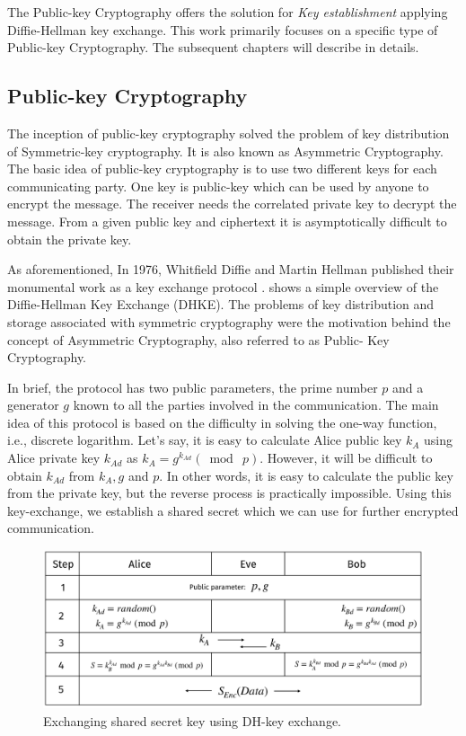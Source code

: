 The Public-key Cryptography offers the solution for \textit{Key establishment} applying Diffie-Hellman key exchange.
This work primarily focuses on a specific type of Public-key Cryptography. 
The subsequent chapters will describe in details.

\subsection{Public-key Cryptography}
\label{ch1_subsec_pkc}
The inception of public-key cryptography solved the problem of key distribution of Symmetric-key cryptography.
It is also known as Asymmetric Cryptography.
The basic idea of public-key cryptography is to use two different keys for each communicating party.
One key is public-key which can be used by anyone to encrypt the message. 
The receiver needs the correlated private key to decrypt the message.
From a given public key and ciphertext it is asymptotically difficult to obtain the private key.

As aforementioned, In 1976, Whitfield Diffie and Martin Hellman published their monumental work as a key exchange protocol \cite{diffie1976new}.  
 shows a simple overview of the Diffie-Hellman Key Exchange (DHKE).
The problems of key distribution and storage associated with symmetric cryptography were the motivation behind the concept of Asymmetric Cryptography, also referred to as Public- Key Cryptography. 

In brief, the protocol has two public parameters, the prime number $p$ and a generator $g$ known to all the parties involved in the communication.
The main idea of this protocol is based on the difficulty in solving the one-way function, i.e., discrete logarithm.
Let's say, it is easy to calculate Alice public key $k_A$ using Alice private key $k_{Ad}$ as $k_A = g^{k_{Ad}} (\bmod ~p).$ 
However, it will be difficult to obtain $k_{Ad}$ from $k_A, g$ and $p$.
In other words, it is easy to calculate the public key from the private key, but the reverse process is practically impossible.
Using this key-exchange, we establish a shared secret which we can use for further encrypted communication.

\begin{figure}
	\centering
	\includegraphics[width=.9\linewidth, height=.67\textheight, keepaspectratio]{Figures/DHKE}
	\caption{Exchanging shared secret key using DH-key exchange.}
	\label{fig_DHKE}
\end{figure}

